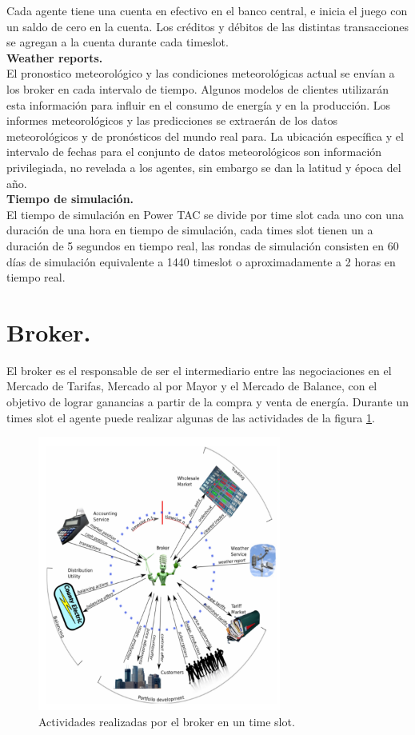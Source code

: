Cada agente tiene una cuenta en efectivo en el banco central, e inicia el juego con un saldo de cero en la cuenta. Los créditos y débitos de las distintas transacciones se agregan a la cuenta durante cada timeslot.\\

\textbf{Weather reports.}\\

El pronostico meteorológico y las condiciones meteorológicas actual se envían a los broker en cada intervalo de tiempo. Algunos modelos de clientes utilizarán esta información para influir en el consumo de energía y en la producción. Los informes meteorológicos y las predicciones se extraerán de los datos meteorológicos y de pronósticos del mundo real para. La ubicación específica y el intervalo de fechas para el conjunto de datos meteorológicos son información privilegiada, no revelada a los agentes, sin embargo se dan la latitud y época del año.\\

\textbf{Tiempo de simulación.}\\

El tiempo de simulación en Power TAC se divide por time slot cada uno con una duración de una hora en tiempo de simulación, cada times slot tienen un a duración de 5 segundos en tiempo real, las rondas de simulación consisten en 60 días de simulación equivalente a 1440 timeslot o aproximadamente a 2 horas en tiempo real.\\

\section{Broker.}

El broker es el responsable de ser el intermediario entre las negociaciones en el Mercado de Tarifas, Mercado al por Mayor y el Mercado de Balance, con el objetivo de lograr ganancias a partir de la compra y venta de energía. Durante un times slot el agente puede realizar algunas de las actividades de la figura \ref{activity}.

\begin{figure}[!h]
    \centering
    \includegraphics[width=8cm]{img/process.png}
    \caption{Actividades realizadas por el broker en un time slot.}
    \label{activity}
\end{figure}

